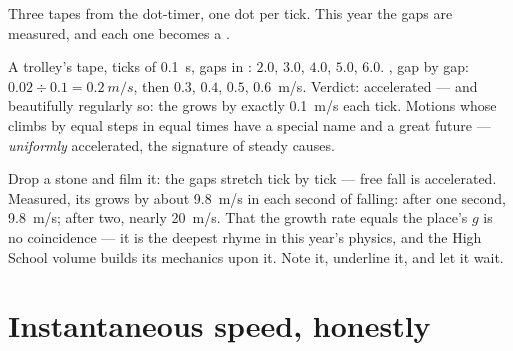 \begin{omfigure}

{\small Three tapes from the dot-timer, one dot per tick.
This year the gaps are measured, and each one becomes a
.}
\end{omfigure}

\begin{example}\label{ex:g9:uniform-varied-motion:worked}
A trolley's tape, ticks of \qty{0.1}{s}, gaps in
: $2.0$, $3.0$, $4.0$, $5.0$, $6.0$. , gap
by gap: $0.02 \div 0.1 = \qty{0.2}{m/s}$, then $0.3$, $0.4$,
$0.5$, \qty{0.6}{m/s}. Verdict: accelerated --- and
beautifully regularly so: the  grows by exactly
\qty{0.1}{m/s} each tick. Motions whose  climbs by
equal steps in equal times have a special name and a great
future --- \emph{uniformly} accelerated, the signature of
steady causes.
\end{example}

\begin{example}\label{ex:g9:uniform-varied-motion:freefall}
Drop a stone and film it: the gaps stretch tick by tick ---
free fall is accelerated. Measured, its  grows by about
\qty{9.8}{m/s} in each second of falling: after one second,
\qty{9.8}{m/s}; after two, nearly \qty{20}{m/s}. That the
growth rate equals the place's $g$ is no coincidence --- it
is the deepest rhyme in this year's physics, and the High
School volume builds its mechanics upon it. Note it,
underline it, and let it wait.
\end{example}

\section{Instantaneous speed, honestly}

